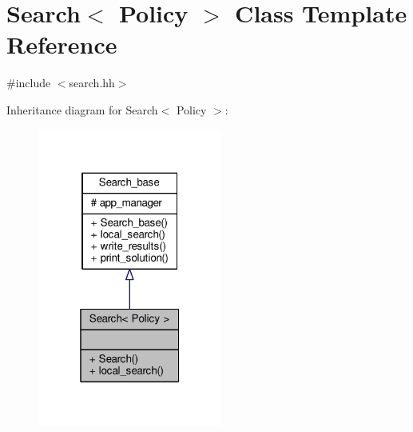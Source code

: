 \hypertarget{classSearch}{\section{Search$<$ Policy $>$ Class Template Reference}
\label{classSearch}
}


{\ttfamily \#include $<$search.\-hh$>$}



Inheritance diagram for Search$<$ Policy $>$\-:\nopagebreak
\begin{figure}[H]
\begin{center}
\leavevmode
\includegraphics[width=172pt]{classSearch__inherit__graph}
\end{center}
\end{figure}



